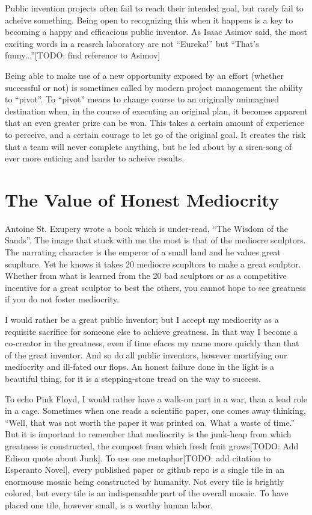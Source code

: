 \documentclass[
	fontsize=10pt, %
	twoside=false, %
	secnumdepth=1, %
]{kaobook}
\begin{document}
Public invention projects often fail to reach their intended goal,
but rarely fail to acheive something.
Being open to recognizing this when it happens is a key to
becoming a happy and efficacious public inventor.
As Isaac Asimov said, the most exciting words in a
reasrch laboratory are not ``Eureka!'' but ``That's funny...''[TODO: find reference to Asimov]

Being able to make use of a new opportunity exposed by
an effort (whether successful or not) is sometimes called
by modern project management the ability to ``pivot''.
To ``pivot'' means to change course to an originally
unimagined destination when, in the course of executing
an original plan, it becomes apparent that an even greater
prize can be won. This takes a certain amount of experience
to perceive, and a certain courage to let go of the original goal.
It creates the risk that a team will never complete anything,
but be led about by a siren-song of ever more enticing and
harder to acheive results.

\section{The Value of Honest Mediocrity}

Antoine St. Exupery wrote a book which is under-read,
``The Wisdom of the Sands''.
The image that stuck with me the most is
that of the mediocre sculptors.
The narrating character is the emperor of a small land
and he values great scuplture.
Yet he knows it takes 20 mediocre scupltors to make
a great sculptor. Whether from what is learned
from the 20 bad sculptors or as a competitive incentive for a
great sculptor to best the others, you cannot
hope to see greatness if you do not foster mediocrity.

I would rather be a great public inventor; but I accept my mediocrity
as a requisite sacrifice for someone else to achieve
greatness. In that way I become a co-creator in
the greatness, even if time efaces my
name more quickly than that of the great inventor.
And so do all public inventors, however mortifying our
mediocrity and ill-fated our flops.
An honest failure done in the light is a beautiful thing,
for it is a stepping-stone tread on the way to success.

To echo Pink Floyd, I would rather have a walk-on part in a war,
than a lead role in a cage.
Sometimes when one reads a scientific paper, one comes away thinking, ``Well, that was not worth the paper it was printed on.
What a waste of time.'' But it is important to remember that mediocrity
is the junk-heap from which greatness is constructed, the compost from which fresh fruit grows[TODO: Add Edison quote about Junk].
To use one metaphor[TODO: add citation to Esperanto Novel], every published paper or github repo is a single tile
in an enormouse mosaic being constructed by humanity. Not every tile is brightly colored, but every tile is
an indispensable part of the overall mosaic.
To have placed one tile, however small, is a worthy human labor.
\end{document}
